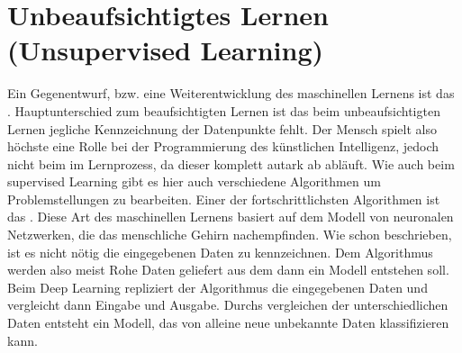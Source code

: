 \documentclass[a4paper,12pt,german,ngerman]{report}
\begin{document}
    \section{Unbeaufsichtigtes Lernen (Unsupervised Learning) }
        Ein Gegenentwurf, bzw. eine Weiterentwicklung des maschinellen Lernens ist das .
        Hauptunterschied zum beaufsichtigten Lernen ist das beim unbeaufsichtigten Lernen jegliche Kennzeichnung der Datenpunkte fehlt.
        Der Mensch spielt also höchste eine Rolle bei der Programmierung des künstlichen Intelligenz, jedoch nicht beim
        im Lernprozess, da dieser komplett autark ab abläuft. Wie auch beim supervised Learning gibt es hier auch verschiedene
        Algorithmen um Problemstellungen zu bearbeiten. Einer der fortschrittlichsten Algorithmen ist das .
        Diese Art des maschinellen Lernens basiert auf dem Modell von neuronalen Netzwerken, die das menschliche
        Gehirn nachempfinden.\cite[]{ibm2021deeplearning}
        Wie schon beschrieben, ist es nicht nötig die eingegebenen Daten zu kennzeichnen. Dem Algorithmus werden also
        meist Rohe Daten geliefert aus dem dann ein Modell entstehen soll. Beim Deep Learning repliziert der Algorithmus
        die eingegebenen Daten und vergleicht dann Eingabe und Ausgabe. Durchs vergleichen der unterschiedlichen Daten
        entsteht ein Modell, das von alleine neue unbekannte Daten klassifizieren kann.




\end{document}
